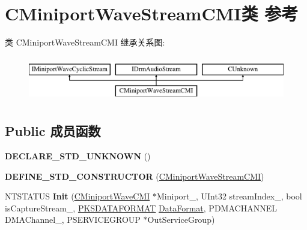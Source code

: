 \hypertarget{class_c_miniport_wave_stream_c_m_i}{}\section{C\+Miniport\+Wave\+Stream\+C\+M\+I类 参考}
\label{class_c_miniport_wave_stream_c_m_i}
类 C\+Miniport\+Wave\+Stream\+C\+MI 继承关系图\+:\begin{figure}[H]
\begin{center}
\leavevmode
\includegraphics[height=2.000000cm]{class_c_miniport_wave_stream_c_m_i}
\end{center}
\end{figure}
\subsection*{Public 成员函数}
\begin{DoxyCompactItemize}
\item 
\mbox{\label{class_c_miniport_wave_stream_c_m_i_a60abe111997b7a60add4d619d8937a18}} 
{\bfseries D\+E\+C\+L\+A\+R\+E\+\_\+\+S\+T\+D\+\_\+\+U\+N\+K\+N\+O\+WN} ()
\item 
\mbox{\label{class_c_miniport_wave_stream_c_m_i_ad88609d613d1e1a32d328bb3b792bbef}} 
{\bfseries D\+E\+F\+I\+N\+E\+\_\+\+S\+T\+D\+\_\+\+C\+O\+N\+S\+T\+R\+U\+C\+T\+OR} (\hyperlink{class_c_miniport_wave_stream_c_m_i}{C\+Miniport\+Wave\+Stream\+C\+MI})
\item 
\mbox{\label{class_c_miniport_wave_stream_c_m_i_a52b27f8e1e447859034f97aa7acd0f58}} 
N\+T\+S\+T\+A\+T\+US {\bfseries Init} (\hyperlink{class_c_miniport_wave_c_m_i}{C\+Miniport\+Wave\+C\+MI} $\ast$Miniport\+\_\+, U\+Int32 stream\+Index\+\_\+, bool is\+Capture\+Stream\+\_\+, \hyperlink{struct_k_s_d_a_t_a_f_o_r_m_a_t}{P\+K\+S\+D\+A\+T\+A\+F\+O\+R\+M\+AT} \hyperlink{struct_data_format}{Data\+Format}, P\+D\+M\+A\+C\+H\+A\+N\+N\+EL D\+M\+A\+Channel\+\_\+, P\+S\+E\+R\+V\+I\+C\+E\+G\+R\+O\+UP $\ast$Out\+Service\+Group)
\end{DoxyCompactItemize}

